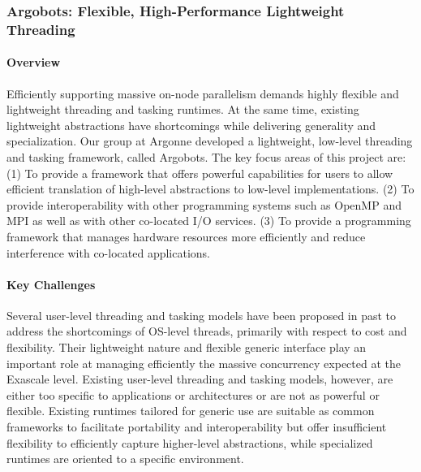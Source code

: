 \subsubsection{ Argobots: Flexible, High-Performance Lightweight Threading }

\paragraph{Overview}

Efficiently supporting massive on-node parallelism demands highly
flexible and lightweight threading and tasking runtimes. At the
same time, existing lightweight abstractions have shortcomings while
delivering generality and specialization.  Our group at Argonne
developed a lightweight, low-level threading and tasking framework,
called Argobots.  The key focus areas of this project are: (1) To
provide a framework that offers powerful capabilities for users to
allow efficient translation of high-level abstractions to low-level
implementations. (2) To provide interoperability with other
programming systems such as OpenMP and MPI as well as with other
co-located I/O services. (3) To provide a programming framework that
manages hardware resources more efficiently and reduce interference
with co-located applications.

\paragraph{Key Challenges}

Several user-level threading and tasking models have been proposed in
past to address the shortcomings of OS-level threads, primarily with
respect to cost and flexibility. Their lightweight nature and flexible
generic interface play an important role at managing efficiently the
massive concurrency expected at the Exascale level.  Existing
user-level threading and tasking models, however, are either too
specific to applications or architectures or are not as powerful or
flexible. Existing runtimes tailored for generic use \cite{GNUPth,
  PLDI97_Taura, COSET05_Thibault, COB14_Nakashima, MTAAP08_Wheeler,
  PPoPP99_Taura, SenSys06_Dunkels, TBB1, EuroPar08_Perache} are
suitable as common frameworks to facilitate portability and
interoperability but offer insufficient flexibility to efficiently
capture higher-level abstractions, while specialized runtimes
\cite{ATC02_Adya, SolarisThreads, SOSP03_von_Behren, StateThreads,
  PLDI07_Li, MTAAP09_Porterfield, WMPP05_Cuvillo, IntelOMP, Nanos++,
  LCPC96_Kale, PACT14_Treichler} are oriented to a specific
environment.

